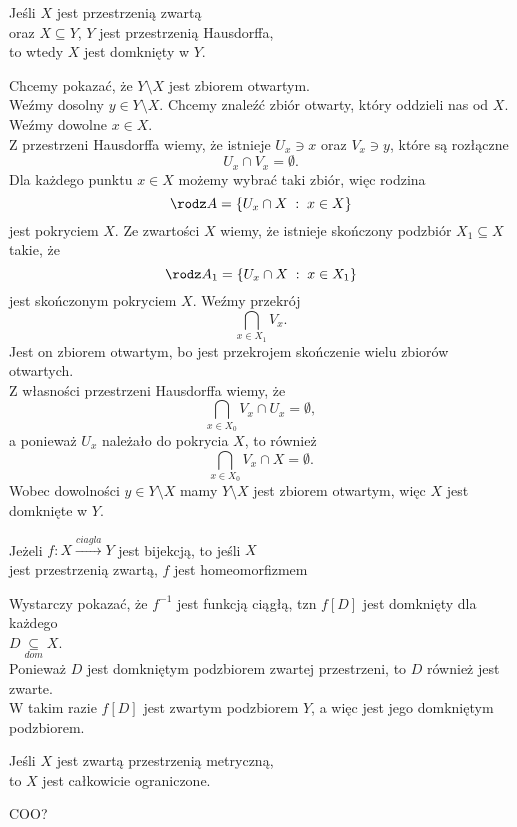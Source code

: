\begin{center}\large
    Jeśli $X$ jest przestrzenią zwartą \\oraz $X\subseteq Y$, $Y$ jest przestrzenią Hausdorffa, \\to wtedy $X$ jest domknięty w $Y$.
\end{center}\bigskip
\dowod
Chcemy pokazać, że $Y\setminus X$ jest zbiorem otwartym.\medskip\\
Weźmy dosolny $y\in Y\setminus X$. Chcemy znaleźć zbiór otwarty, który oddzieli nas od $X$. Weźmy dowolne $x\in X$.\medskip\\
Z przestrzeni Hausdorffa wiemy, że istnieje $U_x\ni x$ oraz $V_x\ni y$, które są rozłączne
$$U_x\cap V_x=\emptyset.$$
Dla każdego punktu $x\in X$ możemy wybrać taki zbiór, więc rodzina
$$\rodz A=\{U_x\cap X\;:\;x\in X\}$$
jest pokryciem $X$. Ze zwartości $X$ wiemy, że istnieje skończony podzbiór $X_1\subseteq X$ takie, że
$$\rodz A_1=\{U_x\cap X\;:\;x\in X_1\}$$
jest skończonym pokryciem $X$. Weźmy przekrój
$$\bigcap\limits_{x\in X_1}V_x.$$
Jest on zbiorem otwartym, bo jest przekrojem skończenie wielu zbiorów otwartych. \\Z własności przestrzeni Hausdorffa wiemy, że
$$\bigcap\limits_{x\in X_0}V_x\cap U_x=\emptyset,$$
a ponieważ $U_x$ należało do pokrycia $X$, to również
$$\bigcap\limits_{x\in X_0}V_x\cap X=\emptyset.$$
Wobec dowolności $y\in Y\setminus X$ mamy $Y\setminus X$ jest zbiorem otwartym, więc $X$ jest domknięte w $Y$.
\kondow

\begin{center}\large
    Jeżeli $f:X\xrightarrow{ciagla} Y$ jest bijekcją, to jeśli $X$ \\jest przestrzenią zwartą, {\color{def}$f$ jest homeomorfizmem}
\end{center}
\dowod
Wystarczy pokazać, że $f^{-1}$ jest funkcją ciągłą, tzn $f[D]$ jest domknięty dla każdego \\$D\underset{dom}\subseteq X$. \medskip\\
Ponieważ $D$ jest domkniętym podzbiorem zwartej przestrzeni, to $D$ również jest zwarte. \\W takim razie $f[D]$ jest zwartym podzbiorem $Y$, a więc jest jego domkniętym podzbiorem.
\kondow
\begin{center}\large
    Jeśli $X$ jest zwartą przestrzenią metryczną, \\to $X$ jest całkowicie ograniczone.
\end{center}
{\large\color{cyan}COO?}